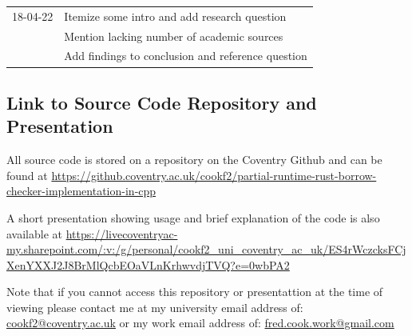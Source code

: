 \documentclass[a4paper]{article}
\begin{document}
\begin{table}[H]
\begin{tabular}{|| c | m{14cm} ||}
        \hline
        18-04-22 & Itemize some intro and add research question \\
                 & Mention lacking number of academic sources \\
                 & Add findings to conclusion and reference question \\

        \hline
	\end{tabular}
\end{table}

\subsection{Link to Source Code Repository and Presentation}\label{appendix:source-code}
All source code is stored on a repository on the Coventry Github and can be found at \href{https://github.coventry.ac.uk/cookf2/partial-runtime-rust-borrow-checker-implementation-in-cpp}{https://github.coventry.ac.uk/cookf2/partial-runtime-rust-borrow-checker-implementation-in-cpp}

A short presentation showing usage and brief explanation of the code is also available at \url{https://livecoventryac-my.sharepoint.com/:v:/g/personal/cookf2_uni_coventry_ac_uk/ES4rWczcksFCjXenYXXJ2J8BrMlQcbEOaVLnKrhwvdjTVQ?e=0wbPA2}

Note that if you cannot access this repository or presentattion at the time of viewing please contact me at my university email address of: \href{cookf2@coventry.ac.uk}{cookf2@coventry.ac.uk} or my work email address of: \href{fred.cook.work@gmail.com}{fred.cook.work@gmail.com}

\newpage
\printglossary[type=main]
\end{document}

